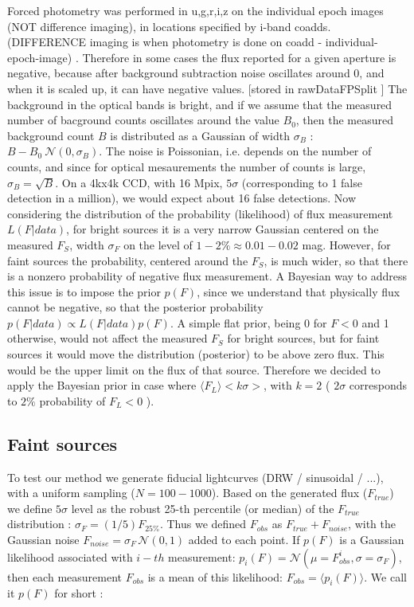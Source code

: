 \documentclass[fleqn,usenatbib]{mnras}  %
\begin{document}
Forced photometry was performed in u,g,r,i,z  on the individual epoch images (NOT difference imaging),  in locations specified by i-band coadds. (DIFFERENCE imaging is when photometry is done on  coadd - individual-epoch-image) . Therefore in some cases the flux reported for a given aperture is negative, because after background subtraction noise oscillates around 0, and when it is scaled up,  it can have negative values. [stored in rawDataFPSplit ]  The background in the  optical bands is bright, and if we assume that the measured number of bacground counts oscillates around the value $B_{0}$, then the measured background count $B$  is distributed as  a Gaussian of width $\sigma_{B}$ :   $B-B_{0}  ~  \mathcal{N}(0,\sigma_{B})$. The noise is Poissonian, i.e. depends on  the number of counts, and since for optical mesaurements the number of counts is large,  $\sigma_{B} = \sqrt {B}$. On a 4kx4k  CCD, with 16 Mpix, $5\sigma$ (corresponding  to  1 false detection in a million), we would expect about 16 false detections.  
Now considering the distribution of the probability (likelihood) of flux measurement   $L(F|data)$, for bright sources it is a very narrow Gaussian centered on the measured $F_{S}$, width $\sigma_{F}$ on the level of $1-2 \%  \approx 0.01-0.02$ mag. However, for faint sources the probability, centered around the $F_{S}$, is much wider, so that there is a nonzero probability of negative flux measurement. A Bayesian  way to address this issue is to impose the prior $p(F)$, since we understand that physically flux cannot be negative, so that the posterior probability $p(F|data) \propto L(F|data) p(F)$. A simple flat prior, being 0 for $F<0$ and 1 otherwise,  would not affect the measured $F_S$ for bright sources, but for faint sources it would move the distribution (posterior) to be above zero flux. This would be the upper limit on the flux of that source.  Therefore we decided to apply the Bayesian prior  in case where  $ \langle F_{L} \rangle  < k \sigma>$, with $k=2$ ( $2 \sigma$ corresponds to $2\%$ probability of $F_{L} < 0$ ). 

\subsection{Faint sources}


To test our method we generate fiducial lightcurves (DRW / sinusoidal / ...), with a uniform sampling ($N=100-1000$). Based on the generated flux ($F_{true}$) we define $5\sigma$ level as the robust 25-th percentile (or median) of the $F_{true}$ distribution :  $\sigma_{F} = (1/5)  F_{25 \%}$. Thus we defined $F_{obs}$ as $F_{true} + F_{noise}$, with the Gaussian noise $F_{noise} = \sigma_{F}  \, \mathcal{N}(0,1)$ added to each point. 
If $p(F)$ is a  Gaussian  likelihood associated with $i-th$ measurement: $p_{i}(F) = \mathcal{N}(\mu=F_{obs}^{i}, \sigma=\sigma_{F})$, then  each measurement $F_{obs}$ is a mean of this likelihood: $F_{obs} = \langle p_{i}(F) \rangle$. We call it $p(F)$  for short : 
\end{document}
